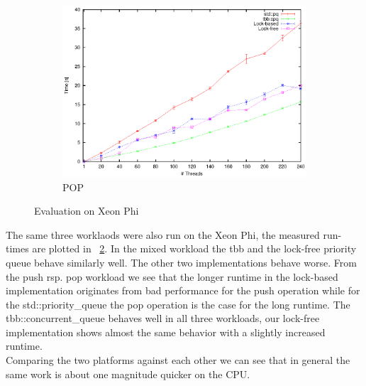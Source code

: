\begin{figure}[t]
\begin{subfigure}[b]{0.3\textwidth}
		\centering
		\includegraphics[width=\textwidth]{../plots/xp_pop/runtime_pop}
		\caption{POP}
		\label{fig:xp_pop}
	\end{subfigure}
	\caption{Evaluation on Xeon Phi}
	\label{fig:eval_xp}
\end{figure}
The same three worklaods were also run on the Xeon Phi, the measured run-times are plotted in \figurename~\ref{fig:eval_xp}. In the mixed workload the tbb and the lock-free priority queue behave similarly well. The other two implementations behave worse. From the push rsp. pop workload we see that the longer runtime in the lock-based implementation originates from bad performance for the push operation while for the std::priority\_queue the pop operation is the case for the long runtime. The tbb::concurrent\_queue behaves well in all three workloads, our lock-free implementation shows almost the same behavior with a slightly increased runtime.\\

Comparing the two platforms against each other we can see that in general the same work is about one magnitude quicker on the CPU.

